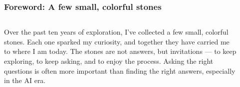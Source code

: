 \documentclass[aspectratio=169]{beamer}
\begin{document}
\begin{frame}
    \frametitle{Foreword: A few small, colorful stones}
        \begin{columns}
        \begin{column}{0.55\textwidth}
Over the past ten years of exploration, I’ve collected a few small, colorful stones.
\newline\newline
Each one sparked my curiosity, and together they have carried me to where I am today.
\newline\newline
The stones are not answers, but invitations — to keep exploring, to keep asking, and to enjoy the process.
\newline\newline
Asking the right questions is often more important than finding the right answers, especially in the AI era.
        \end{column}
        \begin{column}{0.45\textwidth}
            \begin{figure}[ht]\centering
            \end{figure}
        \end{column}
    \end{columns}

\end{frame}
\end{document}
